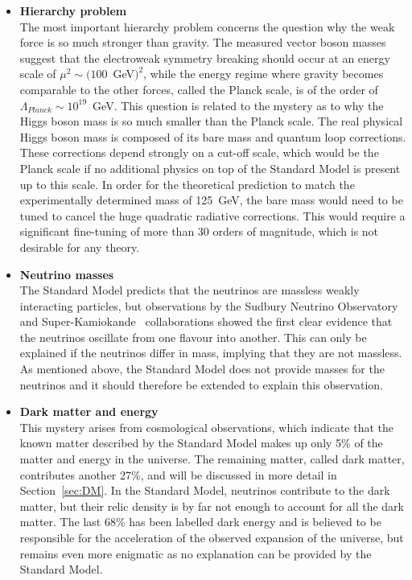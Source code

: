 \begin{itemize}
 \item[]\textbf{Hierarchy problem}\\ 
 The most important hierarchy problem concerns the question why the weak force is so much stronger than gravity. The measured vector boson masses suggest that the electroweak symmetry breaking should occur at an energy scale of $\mu^2 \sim (100$~GeV$)^2$, while the energy regime where gravity becomes comparable to the other forces, called the Planck scale, is of the order of $\Lambda_{Planck} \sim 10^{19}$~GeV. This question is related to the mystery as to why the Higgs boson mass is so much smaller than the Planck scale. The real physical Higgs boson mass is composed of its bare mass and quantum loop corrections. These corrections depend strongly on a cut-off scale, which would be the Planck scale if no additional physics on top of the Standard Model is present up to this scale. In order for the theoretical prediction to match the experimentally determined mass of 125~GeV, the bare mass would need to be tuned to cancel the huge quadratic radiative corrections. This would require a significant fine-tuning of more than 30 orders of magnitude, which is not desirable for any theory.
 
 \item[]\textbf{Neutrino masses}\\ 
 The Standard Model predicts that the neutrinos are massless weakly interacting particles, but observations by the Sudbury Neutrino Observatory~\cite{Ahmad:2002jz} and Super-Kamiokande~\cite{Fukuda:1998mi} collaborations showed the first clear evidence that the neutrinos oscillate from one flavour into another. This can only be explained if the neutrinos differ in mass, implying that they are not massless. As mentioned above, the Standard Model does not provide masses for the neutrinos and it should therefore be extended to explain this observation.
 
 \item[]\textbf{Dark matter and energy}\\
 This mystery arises from cosmological observations, which indicate that the known matter described by the Standard Model makes up only 5\% of the matter and energy in the universe. The remaining matter, called dark matter, contributes another 27\%, and will be discussed in more detail in Section~\ref{sec:DM}. In the Standard Model, neutrinos contribute to the dark matter, but their relic density is by far not enough to account for all the dark matter. The last 68\% has been labelled dark energy and is believed to be responsible for the acceleration of the observed expansion of the universe, but remains even more enigmatic as no explanation can be provided by the Standard Model.
\end{itemize}

